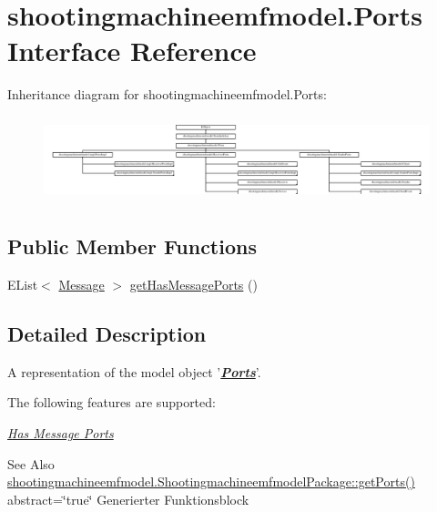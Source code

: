 \hypertarget{interfaceshootingmachineemfmodel_1_1_ports}{\section{shootingmachineemfmodel.\-Ports Interface Reference}
\label{interfaceshootingmachineemfmodel_1_1_ports}
}
Inheritance diagram for shootingmachineemfmodel.\-Ports\-:\begin{figure}[H]
\begin{center}
\leavevmode
\includegraphics[height=2.497213cm]{interfaceshootingmachineemfmodel_1_1_ports}
\end{center}
\end{figure}
\subsection*{Public Member Functions}
\begin{DoxyCompactItemize}
\item 
E\-List$<$ \hyperlink{interfaceshootingmachineemfmodel_1_1_message}{Message} $>$ \hyperlink{interfaceshootingmachineemfmodel_1_1_ports_a62b3641df7f76f3835a16d6c48d11b8b}{get\-Has\-Message\-Ports} ()
\end{DoxyCompactItemize}


\subsection{Detailed Description}
A representation of the model object '{\itshape {\bfseries \hyperlink{interfaceshootingmachineemfmodel_1_1_ports}{Ports}}}'.

The following features are supported\-: 
\begin{DoxyItemize}
\item \hyperlink{interfaceshootingmachineemfmodel_1_1_ports_a62b3641df7f76f3835a16d6c48d11b8b}{{\itshape Has Message Ports}} 
\end{DoxyItemize}

\begin{DoxySeeAlso}{See Also}
\hyperlink{interfaceshootingmachineemfmodel_1_1_shootingmachineemfmodel_package_a3d8e2a50ea904de327878d59e06a49eb}{shootingmachineemfmodel.\-Shootingmachineemfmodel\-Package\-::get\-Ports()}  abstract=\char`\"{}true\char`\"{} Generierter Funktionsblock 
\end{DoxySeeAlso}


